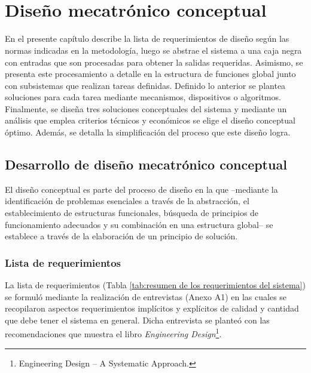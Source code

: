 
\pagestyle{myportland}
\doublespacing
\chapter[\quad\quad\quad\quad ----- Diseño mecatrónico conceptual]{\\ Diseño mecatrónico conceptual}
\thispagestyle{myportland}

En el presente capítulo describe la lista de requerimientos de diseño según las normas indicadas en la metodología, luego se abstrae el sistema a una caja negra con entradas que son procesadas para obtener la salidas requeridas. Asimismo, se presenta este procesamiento a detalle en la estructura de funciones global junto con subsistemas que realizan tareas definidas. Definido lo anterior se plantea soluciones para cada tarea mediante mecanismos, dispositivos o algoritmos. Finalmente, se diseña tres soluciones conceptuales del sistema y mediante un análisis que emplea criterios técnicos y económicos se elige el diseño conceptual óptimo. Además, se detalla la simplificación del proceso que este diseño logra.

\section{Desarrollo de diseño mecatrónico conceptual}
\label{sec:desarrollo del diseno mecatronico conceptual}

El diseño conceptual es parte del proceso de diseño en la que --mediante la identificación de problemas esenciales a través de la abstracción, el establecimiento de estructuras funcionales, búsqueda de principios de funcionamiento adecuados y su combinación en una estructura global-- se establece a través de la elaboración de un principio de solución.\cite[p.~159]{Pahl2007}

\subsection{Lista de requerimientos}

La lista de requerimientos (Tabla \ref{tab:resumen de los requerimientos del sistema}) se formuló mediante la realización de entrevistas (Anexo  A1) en las cuales se recopilaron aspectos requerimientos implícitos y explícitos de calidad y cantidad que debe tener el sistema en general. Dicha entrevista se planteó con las recomendaciones que muestra el libro \textit{Engineering Design}\footnote{Engineering Design – A Systematic Approach.\cite[p.~144-158]{Pahl2007}}.


